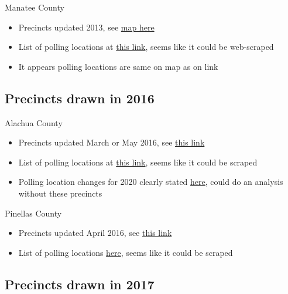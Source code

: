 \documentclass[12pt]{article}
\begin{document}
Manatee County
\begin{itemize}
  \item Precincts updated 2013, see \href{https://www.votemanatee.com/portals/manatee/documents/pct2013.pdf}{map here}
  \item List of polling locations at \href{https://www.voterfocus.com/PrecinctFinder/precinctDirectory?county=FL-MAN}{this link}, seems like it could be web-scraped
  \item It appears polling locations are same on map as on link
\end{itemize}

\clearpage

\subsection{Precincts drawn in 2016}

Alachua County
\begin{itemize}
  \item Precincts updated March or May 2016, see \href{https://www.votealachua.com/Elections/Maps}{this link}
  \item List of polling locations at \href{https://www.voterfocus.com/PrecinctFinder/precinctDirectory?county=FL-ALA}{this link},  seems like it could be scraped
  \item Polling location changes for 2020 clearly stated \href{https://www.votealachua.com/Voters/Precinct-Voting}{here}, could do an analysis without these precincts
\end{itemize}
Pinellas County
\begin{itemize}
  \item Precincts updated April 2016, see \href{https://www.votepinellas.com/General-Information/Maps/District-Maps}{this link}
  \item List of polling locations \href{https://www.voterfocus.com/PrecinctFinder/precinctDirectory?county=FL-PIN}{here},  seems like it could be scraped
\end{itemize}



\clearpage

\subsection{Precincts drawn in 2017}
\end{document}

